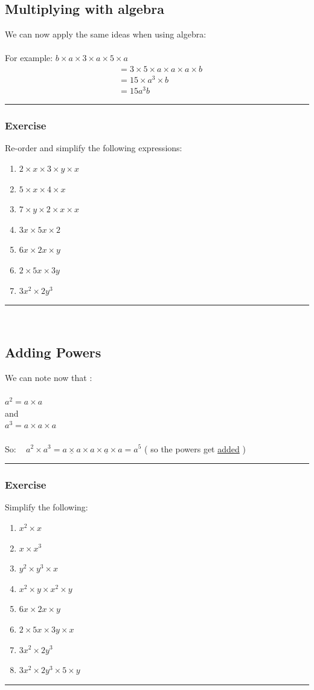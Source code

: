 \documentclass[a4paper,12pt]{article}
\newcommand\question{
	 \rule[0pt]{17cm}{0.5pt}\vspace{-0.5cm}
	\subsubsection{Exercise}

}
\newcommand\questionend{
	\rule[0pt]{17cm}{0.5pt}\vspace{0.0cm}\\
}
\begin{document}
\subsection{Multiplying with algebra}
We can now apply the same ideas when using algebra:\\\\
For example: $b \times a \times 3 \times a \times 5 \times a$
\begin{align*}
&= 3 \times 5 \times a \times a \times a \times b\\
& = 15 \times a^3 \times b\\
& = 15a^3b
\end{align*}
\question
Re-order and simplify the following expressions:
\begin{multicols}{2}
	\begin{enumerate}[label=\normalsize \alph*)~~~]
		\item $2 \times x \times 3 \times y \times x$
		\item $5 \times x \times 4 \times x$
		\item $7 \times y \times 2 \times x \times x$
		\item $3x \times 5x \times 2$
		\item $6x \times 2x \times y$
		\item $2 \times 5x \times 3y $
		\item $3x^2 \times 2y^3$
	\end{enumerate}
\end{multicols}
\questionend
\newpage
\subsection{Adding Powers}
We can note now that :\\\\
$a^2 = a \times a$\\
and\\
$a^3 = a \times a \times a$\\\\
So: ~ $a^2 \times a^3 = \underline{a \times a } \times \underline{a \times a \times a} = a^5 $   ( so the powers get \underline{added} )\\
\question
Simplify the following:
\begin{multicols}{2}
	\begin{enumerate}[label=\normalsize \alph*)~~~]
		\item $x^2 \times x$
		\item $x \times x^3$
		\item $y^2 \times y^3 \times x$
		\item $x^2 \times y \times x^2 \times y$
		\item $6x \times 2x \times y$
		\item $2 \times 5x \times 3y \times x $
		\item $3x^2 \times 2y^3$
		\item $3x^2 \times 2y^3 \times 5 \times y$
	\end{enumerate}
\end{multicols}
\questionend \vspace{-1cm}
\newpage
\end{document}
